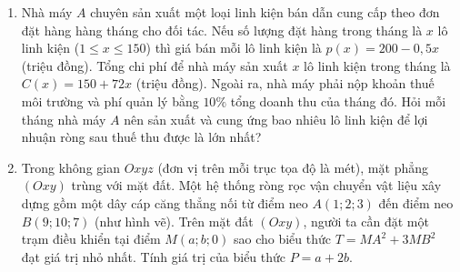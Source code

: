 \documentclass[12pt,a4paper]{article}
\begin{document}
\begin{enumerate}[label=\textbf{Câu \arabic*:}, leftmargin=*]
\begin{minipage}[t]{0.42\linewidth}
{%
}
\end{minipage}
\vspace{0.2cm}

\item Nhà máy $A$ chuyên sản xuất một loại linh kiện bán dẫn cung cấp theo đơn đặt hàng hàng tháng cho đối tác. Nếu số lượng đặt hàng trong tháng là $x$ lô linh kiện ($1 \le x \le 150$) thì giá bán mỗi lô linh kiện là $p(x) = 200 - 0{,}5x$ (triệu đồng). Tổng chi phí để nhà máy sản xuất $x$ lô linh kiện trong tháng là $C(x) = 150 + 72x$ (triệu đồng). Ngoài ra, nhà máy phải nộp khoản thuế môi trường và phí quản lý bằng $10\%$ tổng doanh thu của tháng đó. Hỏi mỗi tháng nhà máy $A$ nên sản xuất và cung ứng bao nhiêu lô linh kiện để lợi nhuận ròng sau thuế thu được là lớn nhất?
\vspace{0.15cm}

\item \begin{minipage}[t]{0.55\linewidth}
Trong không gian $Oxyz$ (đơn vị trên mỗi trục tọa độ là mét), mặt phẳng $(Oxy)$ trùng với mặt đất. Một hệ thống ròng rọc vận chuyển vật liệu xây dựng gồm một dây cáp căng thẳng nối từ điểm neo $A(1; 2; 3)$ đến điểm neo $B(9; 10; 7)$ (như hình vẽ). Trên mặt đất $(Oxy)$, người ta cần đặt một trạm điều khiển tại điểm $M(a; b; 0)$ sao cho biểu thức $T = MA^2 + 3MB^2$ đạt giá trị nhỏ nhất. Tính giá trị của biểu thức $P = a + 2b$.
\end{minipage}\hfill
\begin{minipage}[t]{0.42\linewidth}
\vspace{-0.4\baselineskip}
\centering
{}
\end{minipage}
\end{enumerate}
\end{document}
